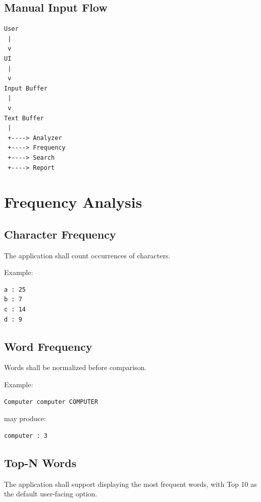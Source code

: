 \documentclass[12pt,a4paper]{article}
\begin{document}
\subsection{Manual Input Flow}

\begin{verbatim}
User
 |
 v
UI
 |
 v
Input Buffer
 |
 v
Text Buffer
 |
 +----> Analyzer
 +----> Frequency
 +----> Search
 +----> Report
\end{verbatim}


\section{Frequency Analysis}

\subsection{Character Frequency}

The application shall count occurrences of characters.

Example:

\begin{verbatim}
a : 25
b : 7
c : 14
d : 9
\end{verbatim}

\subsection{Word Frequency}

Words shall be normalized before comparison.

Example:

\begin{verbatim}
Computer computer COMPUTER
\end{verbatim}

may produce:

\begin{verbatim}
computer : 3
\end{verbatim}

\subsection{Top-N Words}

The application shall support displaying the most frequent words,
with Top 10 as the default user-facing option.
\end{document}
